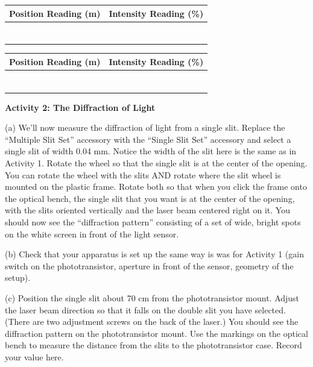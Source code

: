 \vspace{0.3cm}
{\centering \begin{tabular}{|c|c|}
\hline 
Position Reading (m)&
Intensity Reading (\%)\\
\hline
\hline 
&
\\
\hline 
&
\\
\hline 
&
\\
\hline 
&
\\
\hline 
&
\\
\hline 
&
\\
\hline 
&
\\
\hline 
\end{tabular}
\quad
\begin{tabular}{|c|c|}
\hline 
Position Reading (m)&
Intensity Reading (\%)\\
\hline
\hline 
&
\\
\hline 
&
\\
\hline 
&
\\
\hline 
&
\\
\hline 
&
\\
\hline 
&
\\
\hline 
&
\\
\hline 
\end{tabular}}
\vspace{0.3cm}


\textbf{Activity 2: The Diffraction of Light} 

(a) We'll now measure the diffraction of light from a single slit.
Replace the ``Multiple Slit Set'' accessory with the ``Single Slit Set'' accessory
and select a single slit of width 0.04 mm.
Notice the width of the slit here is the same as in Activity 1.
Rotate the wheel so that the single slit is at the center of the opening.
You can rotate the wheel with the slits AND rotate where the slit wheel is mounted
on the plastic frame. 
Rotate both so that when you click the frame onto the optical bench, the single slit that
you want is at the center of the opening, with the slits oriented vertically and the laser beam centered right on
it. You should now see the “diffraction pattern” consisting of a set of wide, bright spots 
on the white screen in front of the light sensor.

(b) Check that your apparatus is set up the same way is was for Activity 1 (gain switch on the phototransistor,
aperture in front of the sensor, geometry of the setup).

(c) Position the single slit about 70 cm from the phototransistor mount. Adjust 
the laser beam direction so that it falls on the double slit you have selected. 
(There are two adjustment screws on the back of the laser.) 
You should see the diffraction pattern on the phototransistor mount. 
Use the markings on the optical bench to measure the distance from the slits
to the phototransistor case.
Record your value here.
\vspace{10mm}

